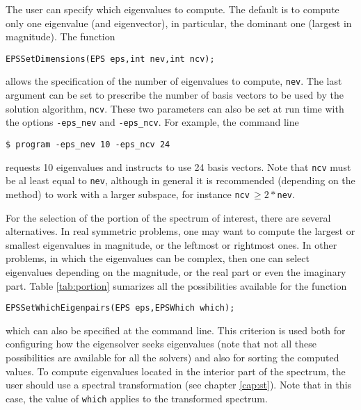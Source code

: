 	The user can specify which eigenvalues to compute. The default is to compute only one eigenvalue (and eigenvector), in particular, the dominant one (largest in magnitude). The function
	\begin{Verbatim}[fontsize=\small]
	EPSSetDimensions(EPS eps,int nev,int ncv);
	\end{Verbatim}
allows the specification of the number of eigenvalues to compute, \texttt{nev}. The last argument can be set to prescribe the number of basis vectors to be used by the solution algorithm, \texttt{ncv}. These two parameters can also be set at run time with the options \Verb!-eps_nev! and \Verb!-eps_ncv!. For example, the command line
\begin{Verbatim}[fontsize=\small]
	$ program -eps_nev 10 -eps_ncv 24
\end{Verbatim}
requests 10 eigenvalues and instructs to use 24 basis vectors. Note that \texttt{ncv} must be al least equal to \texttt{nev}, although in general it is recommended (depending on the method) to work with a larger subspace, for instance \texttt{ncv}$\,\geq \!2*$\texttt{nev}.

	For the selection of the portion of the spectrum of interest, there are several alternatives. In real symmetric problems, one may want to compute the largest or smallest eigenvalues in magnitude, or the leftmost or rightmost ones. In other problems, in which the eigenvalues can be complex, then one can select eigenvalues depending on the magnitude, or the real part or even the imaginary part. Table \ref{tab:portion} sumarizes all the possibilities available for the function
	\begin{Verbatim}[fontsize=\small]
	EPSSetWhichEigenpairs(EPS eps,EPSWhich which);
	\end{Verbatim}
which can also be specified at the command line. This criterion is used both for configuring how the eigensolver seeks eigenvalues (note that not all these possibilities are available for all the solvers) and also for sorting the computed values. To compute eigenvalues located in the interior part of the spectrum, the user should use a spectral transformation (see chapter \ref{cap:st}). Note that in this case, the value of \Verb!which! applies to the transformed spectrum.

